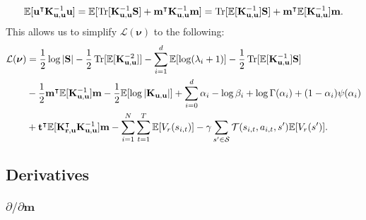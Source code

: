 \documentclass{mprop}
\theoremstyle{definition}
\DeclareMathOperator{\Tr}{Tr}
\begin{document}
\[ \mathbb{E}[\mathbf{u}^\intercal\Kuu^{-1}\mathbf{u}] =
  \mathbb{E}[\Tr[\Kuu^{-1}\mathbf{S}] +
  \mathbf{m}^\intercal\Kuu^{-1}\mathbf{m}] =
  \Tr[\mathbb{E}[\Kuu^{-1}]\mathbf{S}] +
  \mathbf{m}^\intercal\mathbb{E}[\Kuu^{-1}]\mathbf{m}. \]
This allows us to simplify $\mathcal{L}(\bm\nu)$ to the following:
\begin{align*}
  \mathcal{L}(\bm\nu) &= \frac{1}{2}\log|\mathbf{S}| - \frac{1}{2}\Tr[\mathbb{E}[\Kuu^{-2}]] - \sum_{i=1}^d \mathbb{E}[\log(\lambda_i + 1)] - \frac{1}{2}\Tr[\mathbb{E}[\Kuu^{-1}]\mathbf{S}] \\
  &- \frac{1}{2}\mathbf{m}^\intercal\mathbb{E}[\Kuu^{-1}]\mathbf{m} - \frac{1}{2}\mathbb{E}[\log|\Kuu|] + \sum_{i=0}^d \alpha_i - \log\beta_i + \log\Gamma(\alpha_i) + (1 - \alpha_i)\psi(\alpha_i) \\
  &+ \mathbf{t}^\intercal\mathbb{E}[\Kru^\intercal\Kuu^{-1}]\mathbf{m} - \sum_{i=1}^N \sum_{t=1}^T \mathbb{E}[V_r(s_{i,t})] - \gamma\sum_{s' \in \mathcal{S}} \mathcal{T}(s_{i,t}, a_{i,t}, s')\mathbb{E}[V_r(s')]. \\
\end{align*}

\subsection{Derivatives}

\subsubsection{$\partial/\partial\mathbf{m}$}
\end{document}
